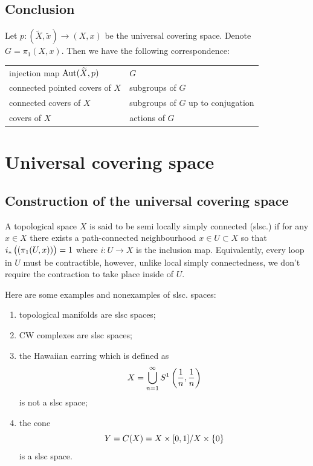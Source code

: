 \documentclass[11pt,a4paper]{article}
\begin{document}
\subsection{Conclusion}
\begin{remark}
  Let $p \colon (\widetilde X, \tilde x) \to (X, x)$ be the universal covering
  space.
  Denote $G = \pi_1(X,x)$.
  Then we have the following correspondence:
  \begin{center}
    \begin{tabular}{l|l}
  injection map  $\operatorname{Aut}(\widetilde X, p)$             & $G$                                \\
    connected pointed covers of $X$ & subgroups of $G$                   \\
    connected covers of $X$         & subgroups of $G$ up to conjugation \\
    covers of $X$                   & actions of $G$                    
    \end{tabular}
  \end{center}
\end{remark}

\newpage

\section{Universal covering space}
\subsection{Construction of the universal covering space}
\begin{definition}
  A topological space $X$ is said to be
  semi locally simply connected (slsc.)
  if for any $x \in X$ there exists a path-connected neighbourhood
  $x \in U \subset X$ so that $i_*\del{(\pi_1(U,x))} = 1$ where
  $i \colon U \to X$ is the inclusion map.
  Equivalently, every loop in $U$ must be contractible, however,
  unlike local simply connectedness, we don't require the contraction
  to take place inside of $U$.
\end{definition}

\begin{example}
  Here are some examples and nonexamples of slsc. spaces:
  \begin{enumerate}
    \item[(1)] topological manifolds are slsc spaces;
    \item[(2)] CW complexes are slsc spaces;
    \item[(3)] the Hawaiian earring which is defined as
      \[
        X = \bigcup_{n=1}^{\infty} S^1\del{\frac{1}{n}, \frac{1}{n}}
      \]
      is not a slsc space;
    \item[(4)] the cone
      \[
        Y = C(X) = X \times [0,1] / X \times \left\{0\right\}
      \]
      is a slsc space.
  \end{enumerate}
\end{example}
\end{document}

